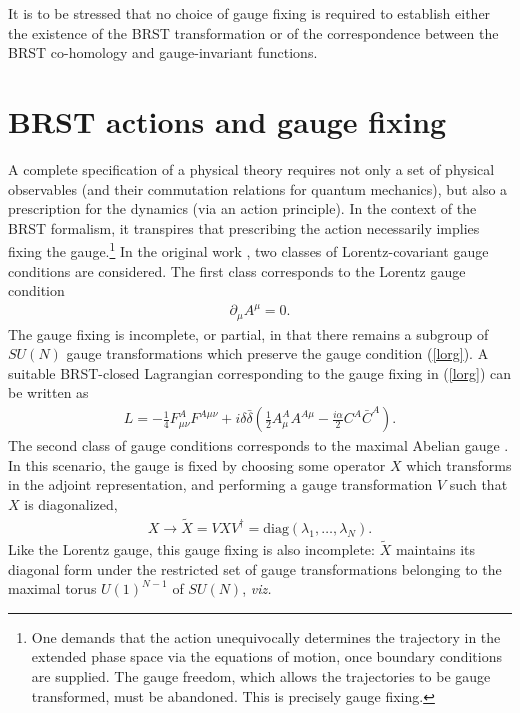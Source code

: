 \documentclass[a4paper,a4paper]{article}
\begin{document}
It is to be stressed that no choice of gauge fixing is required to establish either the existence of the BRST transformation or of the correspondence between the BRST co-homology and gauge-invariant functions.
%
%
%
%
%
%
\section{BRST actions and gauge fixing}
\label{gfix}
A complete specification of a physical theory requires not only a set of physical observables (and their commutation relations for quantum mechanics), but also a prescription for the dynamics (via an action principle). In the context of the BRST formalism, it transpires that prescribing the action necessarily implies fixing the gauge.\footnote{One demands that the action unequivocally determines the trajectory in the extended phase space via the equations of motion, once boundary conditions are supplied. The gauge freedom, which allows the trajectories to be gauge transformed, must be abandoned. This is precisely gauge fixing.} In the original work \cite{Kondo:2001nq}, two classes of Lorentz-covariant gauge conditions are considered. The first class corresponds to the Lorentz gauge condition
\begin{gather} \label{lorg}
\partial_{\mu} A^{\mu} = 0.
\end{gather}
The gauge fixing is incomplete, or partial, in that there remains a subgroup of $SU(N)$ gauge transformations which preserve the gauge condition (\ref{lorg}).
A suitable BRST-closed Lagrangian corresponding to the gauge fixing in (\ref{lorg}) can be written as \cite{Curci:1976bt,Baulieu:1982sb,Baulieu:1985tg}
\begin{gather} \label{lors}
L = -\frac{1}{4} F_{\mu\nu}^{A} F^{A\mu\nu}
+i\delta \bar{\delta} (\frac{1}{2}A_{\mu}^{A}A^{A\mu} - \frac{i\alpha}{2} C^{A} \bar{C}^{A}).
\end{gather}
The second class of gauge conditions corresponds to the maximal Abelian gauge \cite{'tHooft:1981ht,Kronfeld:1987vd,Kronfeld:1987ri}. In this scenario, the gauge is fixed by choosing some operator $X$ which transforms in the adjoint representation, and performing a gauge transformation $V$ such that $X$ is diagonalized,
\begin{gather} \label{mag}
X \rightarrow \tilde{X} = V X V^{\dag} = \mathrm{diag} (\lambda_1, \dots, \lambda_N).
\end{gather}
Like the Lorentz gauge, this gauge fixing is also incomplete: $\tilde{X}$ maintains its diagonal form under the restricted set of gauge transformations belonging to the maximal torus $U(1)^{N-1}$ of $SU(N)$, \emph{viz.\ }
\end{document}

